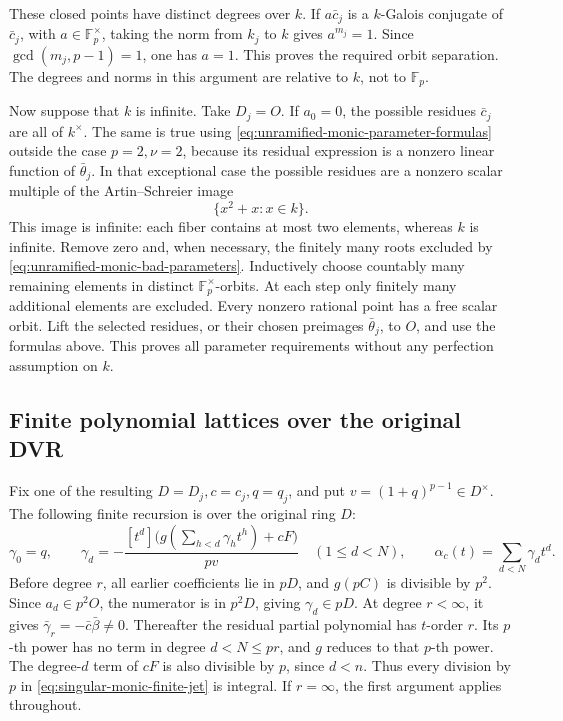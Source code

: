 These closed points have distinct degrees over \(k\).
If \(a\bar c_j\) is a \(k\)-Galois conjugate of \(\bar c_j\),
with \(a\in\mathbb F_p^\times\), taking the norm from \(k_j\)
to \(k\) gives \(a^{m_j}=1\).  Since
\(\gcd(m_j,p-1)=1\), one has \(a=1\).
This proves the required orbit separation.  The degrees and norms
in this argument are relative to \(k\), not to \(\mathbb F_p\).

Now suppose that \(k\) is infinite.  Take \(D_j=O\).
If \(a_0=0\), the possible residues \(\bar c_j\) are all of
\(k^\times\).  The same is true using
\eqref{eq:unramified-monic-parameter-formulas} outside the case
\(p=2,\nu=2\), because its residual expression is a nonzero linear
function of \(\bar\theta_j\).  In that exceptional case the possible
residues are a nonzero scalar multiple of the Artin--Schreier image
\[
 \{x^2+x:x\in k\}.
\]
This image is infinite: each fiber contains at most two elements,
whereas \(k\) is infinite.  Remove zero and, when necessary, the
finitely many roots excluded by
\eqref{eq:unramified-monic-bad-parameters}.  Inductively choose
countably many remaining elements in distinct
\(\mathbb F_p^\times\)-orbits.  At each step only finitely many
additional elements are excluded.  Every nonzero rational point
has a free scalar orbit.  Lift the selected residues, or their
chosen preimages \(\bar\theta_j\), to \(O\), and use the formulas
above.  This proves all parameter requirements without any
perfection assumption on \(k\).

\subsection{Finite polynomial lattices over the original DVR}\label{subsec:singular-monic-polynomial-sections}

Fix one of the resulting \(D=D_j,c=c_j,q=q_j\), and put
\(v=(1+q)^{p-1}\in D^\times\).  The following finite recursion
is over the original ring \(D\):
\begin{equation}\label{eq:singular-monic-finite-jet}
 \gamma_0=q,\qquad
 \gamma_d=-\frac{[t^d]\bigl(g(\sum_{h<d}\gamma_ht^h)+cF\bigr)}{pv}
 \quad(1\le d<N),\qquad
 \alpha_c(t)=\sum_{d<N}\gamma_dt^d.
\end{equation}
Before degree \(r\), all earlier coefficients lie in \(pD\),
and \(g(pC)\) is divisible by \(p^2\).  Since \(a_d\in p^2O\),
the numerator is in \(p^2D\), giving \(\gamma_d\in pD\).
At degree \(r<\infty\), it gives
\(\bar\gamma_r=-\bar c\bar\beta\ne0\).
Thereafter the residual partial polynomial has \(t\)-order \(r\).
Its \(p\)-th power has no term in degree \(d<N\le pr\), and
\(g\) reduces to that \(p\)-th power.  The degree-\(d\) term
of \(cF\) is also divisible by \(p\), since \(d<n\).
Thus every division by \(p\) in
\eqref{eq:singular-monic-finite-jet} is integral.  If \(r=\infty\),
the first argument applies throughout.

